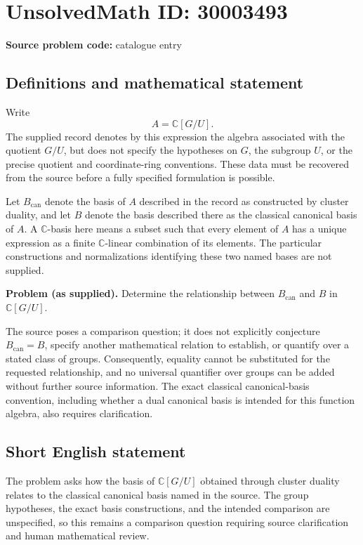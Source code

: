 \documentclass[11pt]{article}
\newcommand{\C}{\mathbb{C}}
\begin{document}
\section*{UnsolvedMath ID: 30003493}
\textbf{Source problem code:} catalogue entry
\subsection{Definitions and mathematical statement}
Write
\[
A=\C[G/U].
\]
The supplied record denotes by this expression the algebra associated with the quotient \(G/U\), but does not specify the hypotheses on \(G\), the subgroup \(U\), or the precise quotient and coordinate-ring conventions. These data must be recovered from the source before a fully specified formulation is possible.

Let \(B_{\mathrm{can}}\) denote the basis of \(A\) described in the record as constructed by cluster duality, and let \(B\) denote the basis described there as the classical canonical basis of \(A\). A \(\C\)-basis here means a subset such that every element of \(A\) has a unique expression as a finite \(\C\)-linear combination of its elements. The particular constructions and normalizations identifying these two named bases are not supplied.

\textbf{Problem (as supplied).} Determine the relationship between \(B_{\mathrm{can}}\) and \(B\) in \(\C[G/U]\).

The source poses a comparison question; it does not explicitly conjecture \(B_{\mathrm{can}}=B\), specify another mathematical relation to establish, or quantify over a stated class of groups. Consequently, equality cannot be substituted for the requested relationship, and no universal quantifier over groups can be added without further source information. The exact classical canonical-basis convention, including whether a dual canonical basis is intended for this function algebra, also requires clarification.
\subsection{Short English statement}
The problem asks how the basis of \(\C[G/U]\) obtained through cluster duality relates to the classical canonical basis named in the source. The group hypotheses, the exact basis constructions, and the intended comparison are unspecified, so this remains a comparison question requiring source clarification and human mathematical review.
\end{document}
